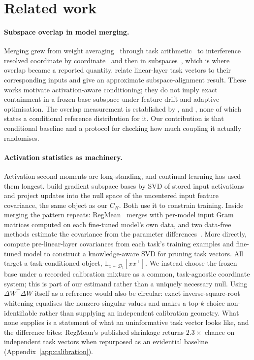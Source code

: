 \section{Related work}
\label{sec:related}

\paragraph{Subspace overlap in model merging.}
Merging grew from weight averaging~\citep{wortsman2022soups,ilharco2022patching,matena2022fisher}
through task arithmetic~\citep{ilharco2023editing,ortizjimenez2023tangent} to interference
resolved coordinate by coordinate~\citep{yadav2023ties,yu2024dare} and then in
subspaces~\citep{stoica2025knots,tang2023concrete,lee2025star}, which is where overlap became a
reported quantity.
\citet{cheng2025wudi} relate linear-layer task vectors to their corresponding inputs and
\citet{qiu2026nufilt} give an approximate subspace-alignment result. These works motivate
activation-aware conditioning; they do not imply exact containment in a frozen-base subspace
under feature drift and adaptive optimisation. The overlap measurement is established by
\citet{gargiulo2025task}, \citet{demystify2026} and \citet{marczak2025iso}, none of which states a
conditional reference distribution for it. Our contribution is that conditional baseline and a
protocol for checking how much coupling it actually randomises.

\paragraph{Activation statistics as machinery.}
Activation second moments are long-standing, and continual learning has used them longest.
\citet{saha2021gpm} build gradient subspace bases by SVD of stored input activations and
\citet{wang2021nullspace} project updates into the null space of the uncentered input feature
covariance, the same object as our $C_H$. Both use it to constrain training.
Inside merging the pattern repeats: RegMean~\citep{jin2023dataless} merges with per-model input
Gram matrices computed on each fine-tuned model's own data, and two data-free methods estimate
the covariance from the parameter differences~\citep{actmat2026,acemerging2026}.
More directly, \citet{an2025pave} compute pre-linear-layer covariances from each task's training
examples and fine-tuned model to construct a knowledge-aware SVD for pruning task vectors.
All target a task-conditioned object, $\mathbb{E}_{x \sim \mathcal{D}_t}[xx^\top]$. We instead
choose the frozen base under a recorded calibration mixture as a common, task-agnostic coordinate
system; this is part of our estimand rather than a uniquely necessary null.
Using $\Delta W^\top\Delta W$ itself as a reference would also be circular: exact inverse-square-root
whitening equalises the nonzero singular values and makes a top-$k$ choice non-identifiable rather
than supplying an independent calibration geometry. What none supplies is a statement of what an uninformative task vector looks like, and the
difference bites: RegMean's published shrinkage returns $2.3\times$ chance on independent task
vectors when repurposed as an evidential baseline
(Appendix~\ref{app:calibration}).


